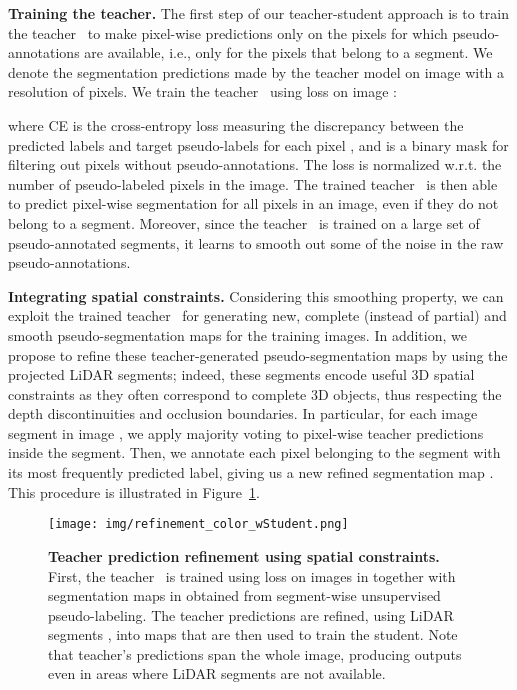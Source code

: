 \documentclass[runningheads]{llncs}
\newcommand{\paragraphcustom}[1]{\smallskip\noindent\textbf{#1}}
\begin{document}
\paragraphcustom{Training the teacher.} The first step of our teacher-student approach is to train the teacher~ to make pixel-wise predictions only on the pixels for which pseudo-annotations are available, i.e., only for the pixels that belong to a segment. We denote  the segmentation predictions made by the teacher model on image  with a resolution of  pixels. We train the teacher~ using loss  on image :  

where CE is the cross-entropy loss measuring the discrepancy between the predicted labels  and target pseudo-labels  for each pixel , 
and  is a  binary mask for filtering out pixels without pseudo-annotations. The loss is normalized w.r.t. the number of pseudo-labeled pixels in the image.
The trained teacher~ is then able to predict pixel-wise segmentation for all pixels in an image, even if they do not belong to a segment. Moreover, since the teacher~ is trained on a large set of pseudo-annotated segments, it learns to smooth out some of the noise in the raw pseudo-annotations.

\paragraphcustom{Integrating spatial constraints.} Considering this smoothing property, we can exploit the trained teacher~ for generating new, complete (instead of partial) and smooth pseudo-segmentation maps for the training images. In addition, we propose to refine these teacher-generated pseudo-segmentation maps by using the projected LiDAR segments; indeed, these segments encode useful 3D spatial constraints as they often correspond to complete 3D objects, thus respecting the depth discontinuities and occlusion boundaries. In particular, for each image segment  in image , we apply majority voting to pixel-wise teacher predictions  inside the segment. Then, we annotate each pixel belonging to the segment with its most frequently predicted label, giving us a new refined segmentation map . This procedure is illustrated in Figure~\ref{fig:refinement}.

\begin{figure}[t]
    \centering
    \texttt{[image: img/refinement\_color\_wStudent.png]}
    \vspace{-20pt}
    \caption{
    \textbf{Teacher prediction refinement using spatial constraints.}
    First, the teacher~ is trained using loss  on images in  together with segmentation maps in  obtained from segment-wise unsupervised pseudo-labeling. The teacher predictions  are refined, using LiDAR segments , into maps  that are then used to train the student.  
    Note that teacher's  predictions span the whole image, producing outputs even in areas where LiDAR segments  are not available.
    }
    \label{fig:refinement}
    \vspace{-3ex}
\end{figure}
\end{document}
